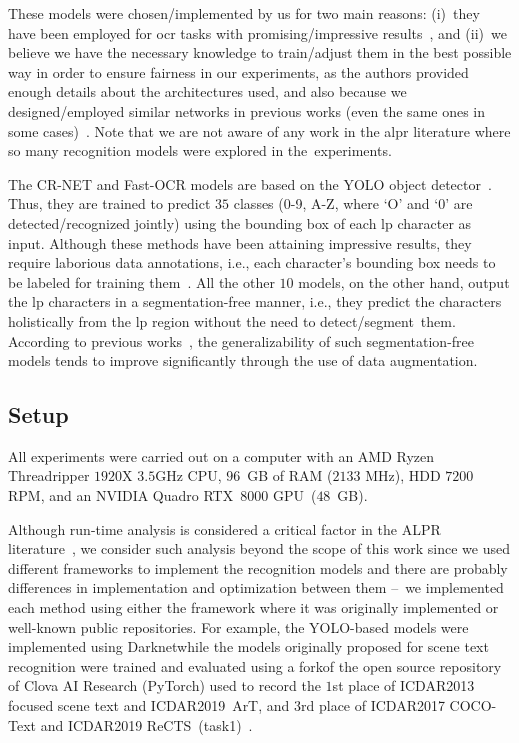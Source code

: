 These models were chosen/implemented by us for two main reasons: 
(i)~they have been employed for \gls*{ocr} tasks with promising/impressive results~\citep{baek2019what,atienza2021vitstr,laroca2021towards}, and (ii)~we believe we have the necessary knowledge to train/adjust them in the best possible way in order to ensure fairness in our experiments, as the authors provided enough details about the  architectures used, and also because we designed/employed similar networks in previous works (even the same ones in some cases)~\citep{goncalves2018realtime,goncalves2019multitask,laroca2019convolutional,laroca2021towards}.
Note that we are not aware of any work in the \gls*{alpr} literature where so many recognition models were explored in the~experiments.
\setcounter{footnote}{5}

The CR-NET and Fast-OCR models are based on the YOLO object detector~\citep{redmon2016yolo}.
Thus, they are trained to predict $35$ classes (0-9, A-Z, where `O' and `0' are detected/recognized jointly) using the bounding box of each \gls*{lp} character as input.
Although these methods have been attaining impressive results, they require laborious data annotations, i.e., each character's bounding box needs to be labeled for training them~\citep{wang2022rethinking}.
All the other $10$ models, on the other hand, output the \gls*{lp} characters in a segmentation-free manner, i.e., they predict  the characters holistically from the \gls*{lp} region without the need to detect/segment~them.
According to previous works~\citep{goncalves2018realtime,atienza2021vitstr,hasnat2021robust}, the generalizability of such segmentation-free models tends to improve significantly through the use of data augmentation.

\subsection{Setup}
\label{sec:experiments-setup}

All experiments were carried out on a computer with an AMD Ryzen Threadripper $1920$X $3.5$GHz CPU, $96$~GB of RAM ($2133$ MHz), HDD $7200$ RPM, and an NVIDIA Quadro RTX~$8000$ GPU~($48$~GB). 

Although run-time analysis is considered a critical factor in the ALPR literature~\citep{lubna2021automatic}, we consider such analysis beyond the scope of this work since we used different frameworks to implement the recognition models and there are probably differences in implementation and optimization between them --~we implemented each method using either the framework where it was originally implemented or well-known public repositories.
For example, the YOLO-based models were implemented using Darknet\footnotemark[5] while the models originally proposed for scene text recognition were trained and evaluated using a fork\footnotemark[3] of the open source repository of Clova AI Research (PyTorch) used to record the $1$st place of ICDAR2013 focused scene text and ICDAR2019~ArT, and $3$rd place of ICDAR2017 COCO-Text and ICDAR2019 ReCTS~(task1)~\citep{baek2019what}.

